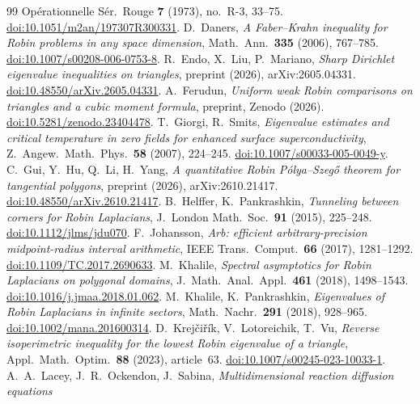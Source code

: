 \documentclass[11pt]{article}
\theoremstyle{remark}
\begin{document}
\begin{thebibliography}{99}
Op\'erationnelle S\'er.\ Rouge \textbf{7} (1973), no.~R-3, 33--75.
\href{https://doi.org/10.1051/m2an/197307R300331}{doi:10.1051/m2an/197307R300331}.
 D.~Daners, \emph{A Faber--Krahn inequality for Robin problems in any space dimension},
Math.\ Ann.\ \textbf{335} (2006), 767--785.
\href{https://doi.org/10.1007/s00208-006-0753-8}{doi:10.1007/s00208-006-0753-8}.
 R.~Endo, X.~Liu, P.~Mariano, \emph{Sharp Dirichlet eigenvalue inequalities on triangles},
preprint (2026), arXiv:2605.04331.
\href{https://doi.org/10.48550/arXiv.2605.04331}{doi:10.48550/arXiv.2605.04331}.
 A.~Ferudun, \emph{Uniform weak Robin comparisons on triangles and a cubic moment
formula}, preprint, Zenodo (2026).
\href{https://doi.org/10.5281/zenodo.23404478}{doi:10.5281/zenodo.23404478}.
 T.~Giorgi, R.~Smits, \emph{Eigenvalue estimates and critical temperature in zero fields for
enhanced surface superconductivity}, Z.\ Angew.\ Math.\ Phys.\ \textbf{58} (2007), 224--245.
\href{https://doi.org/10.1007/s00033-005-0049-y}{doi:10.1007/s00033-005-0049-y}.
 C.~Gui, Y.~Hu, Q.~Li, H.~Yang, \emph{A quantitative Robin P\'olya--Szeg\H{o} theorem for
tangential polygons}, preprint (2026), arXiv:2610.21417.
\href{https://doi.org/10.48550/arXiv.2610.21417}{doi:10.48550/arXiv.2610.21417}.
 B.~Helffer, K.~Pankrashkin, \emph{Tunneling between corners for Robin Laplacians},
J.\ London Math.\ Soc.\ \textbf{91} (2015), 225--248.
\href{https://doi.org/10.1112/jlms/jdu070}{doi:10.1112/jlms/jdu070}.
 F.~Johansson, \emph{Arb: efficient arbitrary-precision midpoint-radius interval
arithmetic}, IEEE Trans.\ Comput.\ \textbf{66} (2017), 1281--1292.
\href{https://doi.org/10.1109/TC.2017.2690633}{doi:10.1109/TC.2017.2690633}.
 M.~Khalile, \emph{Spectral asymptotics for Robin Laplacians on polygonal domains},
J.\ Math.\ Anal.\ Appl.\ \textbf{461} (2018), 1498--1543.
\href{https://doi.org/10.1016/j.jmaa.2018.01.062}{doi:10.1016/j.jmaa.2018.01.062}.
 M.~Khalile, K.~Pankrashkin, \emph{Eigenvalues of Robin Laplacians in infinite sectors},
Math.\ Nachr.\ \textbf{291} (2018), 928--965.
\href{https://doi.org/10.1002/mana.201600314}{doi:10.1002/mana.201600314}.
 D.~Krej\v{c}i\v{r}\'{i}k, V.~Lotoreichik, T.~Vu, \emph{Reverse isoperimetric inequality for
the lowest Robin eigenvalue of a triangle}, Appl.\ Math.\ Optim.\ \textbf{88} (2023), article~63.
\href{https://doi.org/10.1007/s00245-023-10033-1}{doi:10.1007/s00245-023-10033-1}.
 A.~A.~Lacey, J.~R.~Ockendon, J.~Sabina, \emph{Multidimensional reaction diffusion equations
}
\end{thebibliography}
\end{document}
